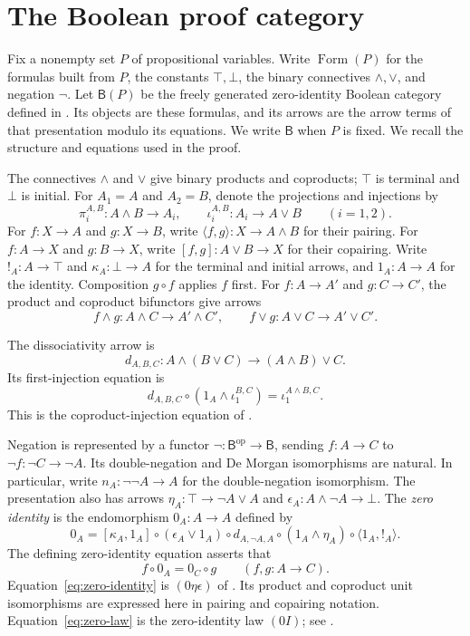 \documentclass[11pt]{article}
\newcommand{\B}{\mathsf B}
\newcommand{\FormulaSet}{\operatorname{Form}}
\begin{document}
\section{The Boolean proof category}\label{sec:category}

Fix a nonempty set $P$ of propositional variables. Write $\FormulaSet(P)$
for the formulas built from $P$, the constants $\top,\bot$, the binary
connectives $\wedge,\vee$, and negation $\neg$. Let $\B(P)$ be the
freely generated zero-identity Boolean category defined in
\cite[\S\S14.2--14.3]{DP}. Its objects are these formulas, and its
arrows are the arrow terms of that presentation modulo its equations.
We write $\B$ when $P$ is fixed. We recall the structure and equations
used in the proof.

The connectives $\wedge$ and $\vee$ give binary products and coproducts;
$\top$ is terminal and $\bot$ is initial. For $A_1=A$ and $A_2=B$,
denote the projections and injections by
\[
 \pi_i^{A,B}:A\wedge B\longrightarrow A_i,
 \qquad
 \iota_i^{A,B}:A_i\longrightarrow A\vee B
 \qquad(i=1,2).
\]
For $f:X\to A$ and $g:X\to B$, write
$\langle f,g\rangle:X\to A\wedge B$ for their pairing.
For $f:A\to X$ and $g:B\to X$, write
$[f,g]:A\vee B\to X$ for their copairing. Write
$!_A:A\to\top$ and $\kappa_A:\bot\to A$ for the terminal and initial
arrows, and $1_A:A\to A$ for the identity. Composition $g\circ f$
applies $f$ first. For $f:A\to A'$ and $g:C\to C'$, the product and
coproduct bifunctors give arrows
\[
 f\wedge g:A\wedge C\longrightarrow A'\wedge C',
 \qquad f\vee g:A\vee C\longrightarrow A'\vee C'.
\]

The dissociativity arrow is
\[
 d_{A,B,C}:A\wedge(B\vee C)\longrightarrow(A\wedge B)\vee C.
\]
Its first-injection equation is
\begin{equation}
 d_{A,B,C}\circ(1_A\wedge\iota_1^{B,C})
   =\iota_1^{A\wedge B,C}.
 \label{eq:first-injection}
\end{equation}
This is the coproduct-injection equation of
\cite[\S11.1, p.~234]{DP}.

Negation is represented by a functor
$\neg:\B^{\mathrm{op}}\to\B$, sending $f:A\to C$ to
$\neg f:\neg C\to\neg A$. Its double-negation and De Morgan
isomorphisms are natural. In particular, write
$n_A:\neg\neg A\to A$ for the double-negation isomorphism.
The presentation also has arrows
$\eta_A:\top\to\neg A\vee A$ and
$\epsilon_A:A\wedge\neg A\to\bot$.
The \emph{zero identity} is the endomorphism $0_A:A\to A$ defined by
\begin{equation}
 0_A=[\kappa_A,1_A]\circ(\epsilon_A\vee1_A)\circ d_{A,\neg A,A}
     \circ(1_A\wedge\eta_A)\circ\langle1_A,!_A\rangle.
 \label{eq:zero-identity}
\end{equation}
The defining zero-identity equation asserts that
\begin{equation}
 f\circ0_A=0_C\circ g
 \qquad(f,g:A\to C).
 \label{eq:zero-law}
\end{equation}
Equation~\eqref{eq:zero-identity} is $(0\eta\epsilon)$ of
\cite[\S14.2, p.~317]{DP}. Its product and coproduct unit isomorphisms
are expressed here in pairing and copairing notation.
Equation~\eqref{eq:zero-law} is the zero-identity law $(0I)$;
see \cite[\S14.3, p.~322]{DP}.
\end{document}
